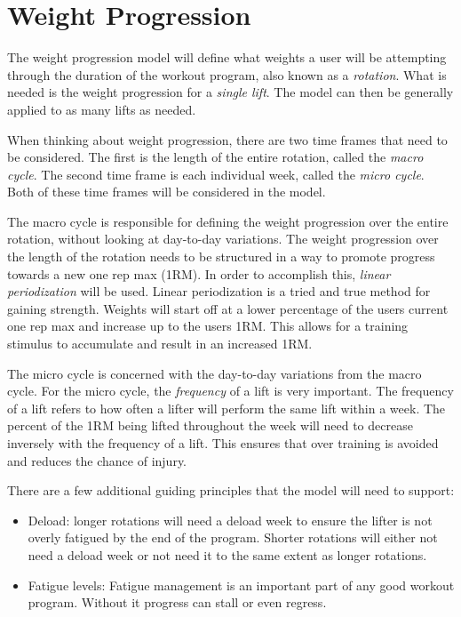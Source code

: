 \section{Weight Progression}

The weight progression model will define what weights a user will be attempting through the duration of the workout program, also known as a \textit{rotation}. What is needed is the weight progression for a \textit{single lift}. The model can then be generally applied to as many lifts as needed.

When thinking about weight progression, there are two time frames that need to be considered. The first is the length of the entire rotation, called the \textit{macro cycle}. The second time frame is each individual week, called the \textit{micro cycle}. Both of these time frames will be considered in the model.

The macro cycle is responsible for defining the weight progression over the entire rotation, without looking at day-to-day variations. The weight progression over the length of the rotation needs to be structured in a way to promote progress towards a new one rep max (1RM). In order to accomplish this, \textit{linear periodization} will be used. Linear periodization is a tried and true method for gaining strength. Weights will start off at a lower percentage of the users current one rep max and increase up to the users 1RM. This allows for a training stimulus to accumulate and result in an increased 1RM.
 
The micro cycle is concerned with the day-to-day variations from the macro cycle. For the micro cycle, the \textit{frequency} of a lift is very important. The frequency of a lift refers to how often a lifter will perform the same lift within a week. The percent of the 1RM being lifted throughout the week will need to decrease inversely with the frequency of a lift. This ensures that over training is avoided and reduces the chance of injury.

There are a few additional guiding principles that the model will need to support:
\begin{itemize}
    \item Deload: longer rotations will need a deload week to ensure the lifter is not overly fatigued by the end of the program. Shorter rotations will either not need a deload week or not need it to the same extent as longer rotations.
    \item Fatigue levels: Fatigue management is an important part of any good workout program. Without it progress can stall or even regress.
\end{itemize}

